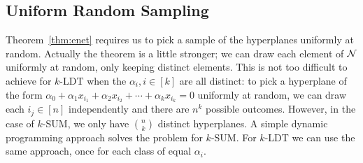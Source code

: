 
\subsection{Uniform Random Sampling}%
\label{app:sampling}

Theorem~\ref{thm:enet} requires us to pick a sample of the hyperplanes
uniformly at random. Actually the theorem is a little stronger; we can draw
each element of $\mathcal{N}$ uniformly at random, only keeping distinct elements.
This is not too difficult to achieve for $k$-LDT when the $\alpha_i,i\in[k]$
are all distinct: to pick a hyperplane of the form $\alpha_0 + \alpha_1 x_{i_1}
+ \alpha_2 x_{i_2} + \cdots + \alpha_k x_{i_k} = 0$ uniformly at random, we can
draw each $i_j\in[n]$ independently and there are $n^k$ possible outcomes.
However, in the case of $k$-SUM, we only have $\binom{n}{k}$ distinct
hyperplanes. A simple dynamic programming approach solves the problem for
\(k\)-SUM. For \(k\)-LDT we can use the same approach, once for each class of equal
$\alpha_i$.

